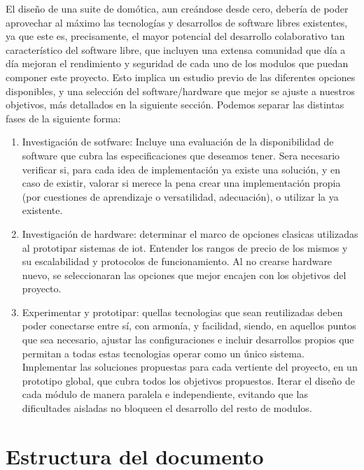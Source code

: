 El diseño de una suite de domótica, aun creándose desde cero, debería de poder aprovechar al máximo las tecnologías y desarrollos de software libres existentes, ya que este es, precisamente, el mayor potencial del desarrollo colaborativo tan característico del software libre, que incluyen una extensa comunidad que día a día mejoran el rendimiento y seguridad de cada uno de los modulos que puedan componer este proyecto. Esto implica un estudio previo de las diferentes opciones disponibles, y una selección del software/hardware que mejor se ajuste a nuestros objetivos, más detallados en la siguiente sección. Podemos separar las distintas fases de la siguiente forma:

\begin{enumerate}
  \item Investigación de sotfware: Incluye una evaluación de la disponibilidad de software que cubra las especificaciones que deseamos tener. Sera necesario verificar si, para cada idea de implementación ya existe una solución, y en caso de existir, valorar si merece la pena crear una implementación propia (por cuestiones de aprendizaje o versatilidad, adecuación), o utilizar la ya existente.

  \item Investigación de hardware: determinar el marco de opciones clasicas utilizadas al prototipar sistemas de \gls{iot}. Entender los rangos de precio de los mismos y su escalabilidad y protocolos de funcionamiento. Al no crearse hardware nuevo, se seleccionaran las opciones que mejor encajen con los objetivos del proyecto.

  \item Experimentar y prototipar: quellas tecnologias que sean reutilizadas deben poder conectarse entre sí, con armonía, y facilidad, siendo, en aquellos puntos que sea necesario, ajustar las configuraciones e incluir desarrollos propios que permitan a todas estas tecnologias operar como un único sistema. Implementar las soluciones propuestas para cada vertiente del proyecto, en un prototipo global, que cubra todos los objetivos propuestos. Iterar el diseño de cada módulo de manera paralela e independiente, evitando que las dificultades aisladas no bloqueen el desarrollo del resto de modulos.

\end{enumerate}

\section{Estructura del documento}
\label{ch:Capitulo1.3}

